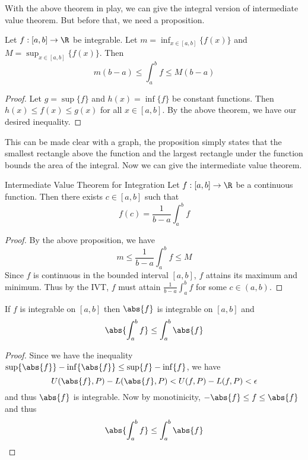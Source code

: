 With the above theorem in play, we can give the integral version of intermediate value theorem. But before that, we need a proposition. 

\begin{prp}{}{} Let $f:[a,b]\to\R$ be integrable. Let $m=\inf_{x\in[a,b]}\{f(x)\}$ and $M=\sup_{x\in[a,b]}\{f(x)\}$. Then $$m(b-a)\leq\int_{a}^{b}f\leq M(b-a)$$ \tcbline
\begin{proof} Let $g=\sup\{f\}$ and $h(x)=\inf\{f\}$ be constant functions. Then $h(x)\leq f(x)\leq g(x)$ for all $x\in[a,b]$. By the above theorem, we have our desired inequality. 
\end{proof}
\end{prp}

This can be made clear with a graph, the proposition simply states that the smallest rectangle above the function and the largest rectangle under the function bounds the area of the integral. Now we can give the intermediate value theorem. 

\begin{thm}{Intermediate Value Theorem for Integration}{} Let $f:[a,b]\to\R$ be a continuous function. Then there exists $c\in[a,b]$ such that $$f(c)=\frac{1}{b-a}\int_{a}^{b}f$$ \tcbline
\begin{proof} By the above proposition, we have $$m\leq\frac{1}{b-a}\int_a^bf\leq M$$ Since $f$ is continuous in the bounded interval $[a,b]$, $f$ attains its maximum and minimum. Thus by the IVT, $f$ must attain $\frac{1}{b-a}\int_a^bf$ for some $c\in(a,b)$. 
\end{proof}
\end{thm}

\begin{thm}{}{} If $f$ is integrable on $[a,b]$ then $\abs{f}$ is integrable on $[a,b]$ and $$\abs{\int_{a}^{b}f}\leq\int_{a}^{b}\abs{f}$$ \tcbline\begin{proof} Since we have the inequality $\sup\{\abs{f}\}-\inf\{\abs{f}\}\leq\sup\{f\}-\inf\{f\}$, we have $$U(\abs{f},P)-L(\abs{f},P)<U(f,P)-L(f,P)<\epsilon$$ and thus $\abs{f}$ is integrable. Now by monotinicity, $-\abs{f}\leq f\leq\abs{f}$ and thus $$\abs{\int_a^bf}\leq\int_a^b\abs{f}$$
\end{proof}
\end{thm}

